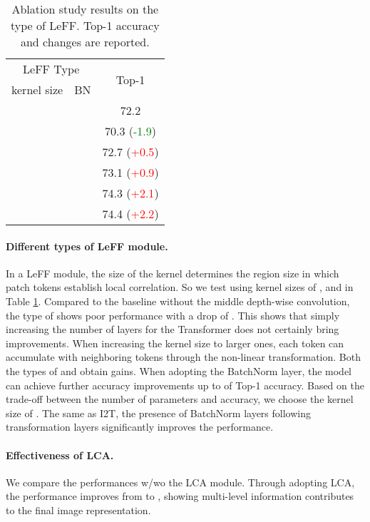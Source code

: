 \documentclass[10pt,twocolumn,letterpaper]{article}
\newcommand{\cmark}{\ding{51}}
\newcommand{\xmark}{\ding{55}}
\begin{document}
\begin{table}[t]
    \centering
    \footnotesize
    \caption{Ablation study results on the type of LeFF. Top-1 accuracy and changes are reported.}
    \begin{tabular}{ccc}
         \toprule
         \multicolumn{2}{c}{LeFF Type} & \multirow{2}{*}{Top-1} \\
         \cmidrule{1-2}
         kernel size & BN & \\
         \midrule
         \xmark & \xmark & 72.2 \\
         \midrule
          & \xmark & 70.3 (\textcolor{Green}{-1.9}) \\
          & \xmark & 72.7 (\textcolor{Red}{+0.5}) \\
          & \xmark & 73.1 (\textcolor{Red}{+0.9}) \\
         \midrule
          & \cmark & 74.3 (\textcolor{Red}{+2.1}) \\
          & \cmark & 74.4 (\textcolor{Red}{+2.2}) \\
         \bottomrule
    \end{tabular}
    \label{tab:leff}
    \vspace{-1.5em}
\end{table}

\paragraph{Different types of LeFF module.} In a LeFF module, the size of the kernel determines the region size in which patch tokens establish local correlation. So we test using kernel sizes of ,  and  in Table \ref{tab:leff}. Compared to the baseline without the middle depth-wise convolution, the type of  shows poor performance with a drop of . This shows that simply increasing the number of layers for the Transformer does not certainly bring improvements. When increasing the kernel size to larger ones, each token can accumulate with neighboring tokens through the non-linear transformation. Both the types of  and  obtain gains. When adopting the BatchNorm layer, the model can achieve further accuracy improvements up to  of Top-1 accuracy. Based on the trade-off between the number of parameters and accuracy, we choose the kernel size of . The same as I2T, the presence of BatchNorm layers following transformation layers significantly improves the performance.


\paragraph{Effectiveness of LCA.} We compare the performances w/wo the LCA module. Through adopting LCA, the performance improves from  to , showing multi-level information contributes to the final image representation.
\end{document}
